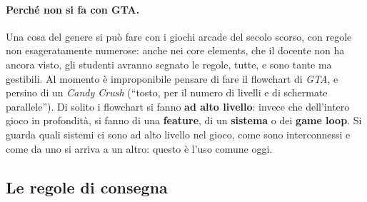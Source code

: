 \paragraph{Perché non si fa con GTA.} Una cosa del genere si può fare con i
giochi arcade del secolo scorso, con regole non esageratamente numerose:
anche nei core elements, che il docente non ha ancora visto, gli studenti
avranno segnato le regole, tutte, e sono tante ma gestibili. Al momento è
improponibile pensare di fare il flowchart di \emph{GTA}, e persino di un
\emph{Candy Crush} (``tosto, per il numero di livelli e di schermate
parallele''). Di solito i flowchart si fanno \textbf{ad alto livello}:
invece che dell'intero gioco in profondità, si fanno di una
\textbf{feature}, di un \textbf{sistema} o dei \textbf{game loop}. Si guarda
quali sistemi ci sono ad alto livello nel gioco, come sono interconnessi e
come da uno si arriva a un altro: questo è l'uso comune oggi.

\subsection{Le regole di consegna}

